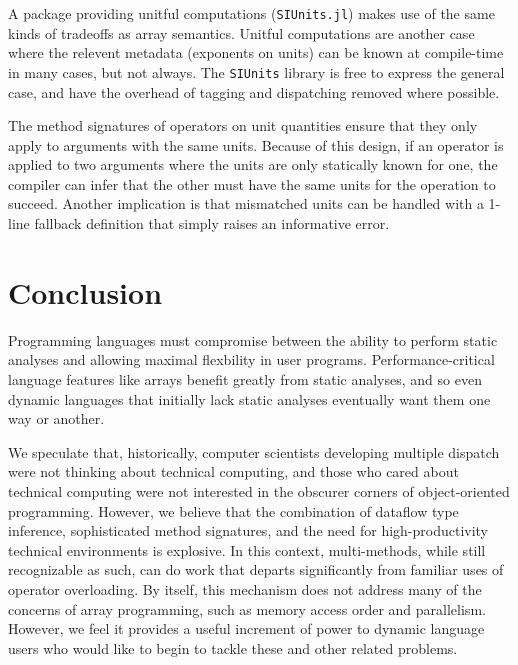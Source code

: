 \documentclass[preprint]{sigplanconf}
\newcommand{\code}[1]{\texttt{#1}}
\begin{document}
A package providing unitful computations (\code{SIUnits.jl}\cite{Fischer:2014si})
makes use of the same kinds of
tradeoffs as array semantics. Unitful computations are another case
where the relevent metadata (exponents on units) can be
known at compile-time in many cases, but not always. The
\code{SIUnits} library is free to express the general case, and have the
overhead of tagging and dispatching removed where possible.

The method signatures of operators on unit quantities ensure that they only
apply to arguments with the same units. Because of this design, if an
operator is applied to two arguments where the units are only statically
known for one, the compiler can infer that the other must have the same units
for the operation to succeed. Another implication is that mismatched units can
be handled with a 1-line fallback definition that simply raises an
informative error.


\section{Conclusion}

Programming languages must compromise between the ability to perform
static analyses and allowing maximal flexbility in user programs.
Performance-critical language features like arrays benefit greatly from
static analyses, and so even dynamic languages that initially lack static
analyses eventually want them one way or another.

We speculate that, historically, computer scientists developing multiple 
dispatch were not thinking about technical computing, and those who cared
about technical computing were not interested in the obscurer corners of
object-oriented programming. However, we believe that the combination of
dataflow type inference, sophisticated method signatures, and the need for
high-productivity technical environments is explosive. In this context,
multi-methods, while still recognizable as such, can do work that departs
significantly from familiar uses of operator overloading. By itself, this
mechanism does not address many of the concerns of array programming, such
as memory access order and parallelism. However, we feel it provides a
useful increment of power to dynamic language users who would like to begin
to tackle these and other related problems.

\end{document}
